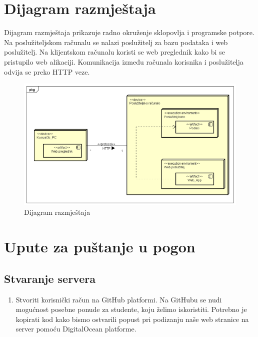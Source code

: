 \begin{flushleft}
			\eject 
		
		
		\section{Dijagram razmještaja}
			
			
			
			  \noindent Dijagram razmještaja prikazuje radno okruženje sklopovlja i programske potpore. Na poslužiteljskom računalu se nalazi poslužitelj za bazu podataka i web poslužitelj. Na klijentskom računalu koristi se web preglednik kako bi se pristupilo web alikaciji. Komunikacija između računala korisnika i poslužitelja odvija se preko HTTP veze.
			
			\begin{figure}[hp]
                    \centering
                    \includegraphics[width=16cm]{slike/Dijagram_razmjestaja.png}
                    \caption{Dijagram razmještaja}
                    \label{fig:DR_01}
                \end{figure}
			    
			\eject 
			
		
		\section{Upute za puštanje u pogon}
		
			\subsection{Stvaranje servera}
			
	        \begin{enumerate}
			
			
			\item Stvoriti korisnički račun na GitHub platformi. Na GitHubu se nudi mogućnost posebne ponude za studente, koju želimo iskoristiti. Potrebno je kopirati kod kako bismo ostvarili popust pri podizanju naše web stranice na server pomoću DigitalOcean platforme.
			

\end{enumerate}
\end{flushleft}
